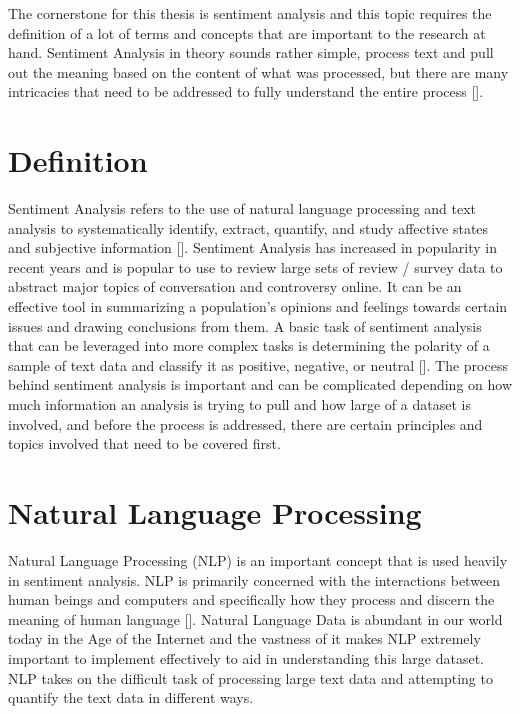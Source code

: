 The cornerstone for this thesis is sentiment analysis and this topic requires the definition of a lot of terms and concepts that are important to the research at hand.
Sentiment Analysis in theory sounds rather simple, process text and pull out the meaning based on the content of what was processed, but there are many intricacies that need to be addressed to fully understand the entire process [\cite{liu2012sentiment}].

\section{Definition}
Sentiment Analysis refers to the use of natural language processing and text analysis to systematically identify, extract, quantify, and study affective states and subjective information [\cite{liu2012sentiment}].
Sentiment Analysis has increased in popularity in recent years and is popular to use to review large sets of review / survey data to abstract major topics of conversation and controversy online.
It can be an effective tool in summarizing a population's opinions and feelings towards certain issues and drawing conclusions from them.
A basic task of sentiment analysis that can be leveraged into more complex tasks is determining the polarity of a sample of text data and classify it as positive, negative, or neutral [\cite{wilson2005recognizing}].
The process behind sentiment analysis is important and can be complicated depending on how much information an analysis is trying to pull and how large of a dataset is involved, and before the process is addressed, there are certain principles and topics involved that need to be covered first.

\section{Natural Language Processing}
Natural Language Processing (NLP) is an important concept that is used heavily in sentiment analysis.
NLP is primarily concerned with the interactions between human beings and computers and specifically how they process and discern the meaning of human language [\cite{liddy2001natural}].
Natural Language Data is abundant in our world today in the Age of the Internet and the vastness of it makes NLP extremely important to implement effectively to aid in understanding this large dataset.
NLP takes on the difficult task of processing large text data and attempting to quantify the text data in different ways.

